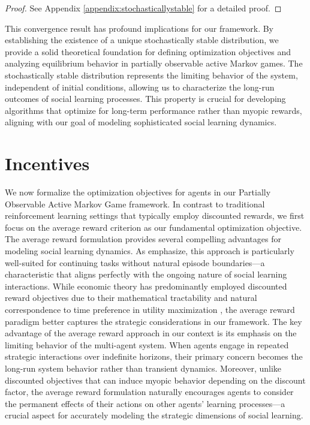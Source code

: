 \documentclass[a4paper,12pt]{report}
\begin{document}
\begin{proof}
    See Appendix \ref{appendix:stochasticallystable} for a detailed proof.
\end{proof}
This convergence result has profound implications for our framework. By establishing the existence of a unique stochastically stable distribution, we provide a solid theoretical foundation for defining optimization objectives and analyzing equilibrium behavior in partially observable active Markov games. The stochastically stable distribution represents the limiting behavior of the system, independent of initial conditions, allowing us to characterize the long-run outcomes of social learning processes. This property is crucial for developing algorithms that optimize for long-term performance rather than myopic rewards, aligning with our goal of modeling sophisticated social learning dynamics.

\section{Incentives}
We now formalize the optimization objectives for agents in our Partially Observable Active Markov Game framework. In contrast to traditional reinforcement learning settings that typically employ discounted rewards, we first focus on the average reward criterion as our fundamental optimization objective.
The average reward formulation provides several compelling advantages for modeling social learning dynamics. As \citet{sutton2018reinforcement} emphasize, this approach is particularly well-suited for continuing tasks without natural episode boundaries—a characteristic that aligns perfectly with the ongoing nature of social learning interactions. While economic theory has predominantly employed discounted reward objectives due to their mathematical tractability and natural correspondence to time preference in utility maximization \citep{koopmans1960stationary, stokey1989recursive}, the average reward paradigm better captures the strategic considerations in our framework.
The key advantage of the average reward approach in our context is its emphasis on the limiting behavior of the multi-agent system. When agents engage in repeated strategic interactions over indefinite horizons, their primary concern becomes the long-run system behavior rather than transient dynamics. Moreover, unlike discounted objectives that can induce myopic behavior depending on the discount factor, the average reward formulation naturally encourages agents to consider the permanent effects of their actions on other agents' learning processes—a crucial aspect for accurately modeling the strategic dimensions of social learning.
\end{document}

